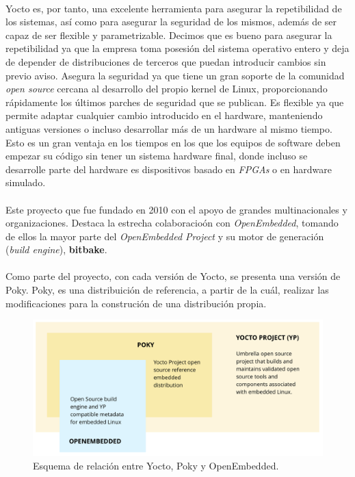 \paragraph{} Yocto es, por tanto, una excelente herramienta para asegurar la repetibilidad
de los sistemas, así como para asegurar la seguridad de los mismos, además de ser capaz
de ser flexible y parametrizable. Decimos que es bueno para asegurar la repetibilidad
ya que la empresa toma posesión del sistema operativo entero y deja de depender de
distribuciones de terceros que puedan introducir cambios sin previo aviso. Asegura la
seguridad ya que tiene un gran soporte de la comunidad \emph{\gls{open source}} cercana
al desarrollo del propio kernel de Linux, proporcionando rápidamente los últimos parches
de seguridad que se publican. Es flexible ya que permite adaptar cualquier cambio
introducido en el hardware, manteniendo antiguas versiones o incluso desarrollar más de
un hardware al mismo tiempo. Esto es un gran ventaja en los tiempos en los que los equipos
de software deben empezar su código sin tener un sistema hardware final, donde incluso
se desarrolle parte del hardware es dispositivos basado en \emph{\gls{FPGAs}} o en
hardware simulado.

\paragraph{} Este proyecto que fue fundado en 2010 con el apoyo de grandes multinacionales
y organizaciones. Destaca la estrecha colaboracioón con \emph{OpenEmbedded}, tomando de
ellos la mayor parte del \emph{OpenEmbedded Project} y su motor de generación (\emph{build
engine}), \textbf{bitbake}.

\paragraph{} Como parte del proyecto, con cada versión de Yocto, se presenta una versión
de Poky. Poky, es una distribuición de referencia, a partir de la cuál, realizar las
modificaciones para la construción de una distribución propia.

\begin{figure}[h]
	\centering
	\includegraphics[width=0.60\linewidth]{figs/yocto-overview}
	\caption[Yocto Overview]{Esquema de relación entre Yocto, Poky y OpenEmbedded.}
	\label{fig:yocto_overview}
\end{figure}

